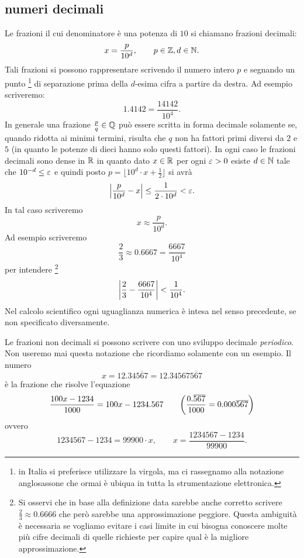 \subsection{numeri decimali}
%
Le frazioni il cui denominatore è una potenza
di $10$ si chiamano frazioni decimali:
\[
  x = \frac{p}{10^d}, \qquad p\in {\mathbb Z}, d\in {\mathbb N}.
\]
Tali frazioni si possono rappresentare
scrivendo il numero
intero $p$ e segnando un punto
\footnote{%
in Italia si preferisce utilizzare la virgola, ma
ci rassegnamo alla notazione anglosassone che ormai è
ubiqua in tutta la strumentazione elettronica.
}%
di separazione
prima della $d$-esima cifra a partire da destra.
Ad esempio scriveremo:
\[
  1.4142 = \frac{14142}{10^4}.
\]
In generale una frazione $\frac{p}{q}\in {\mathbb Q}$
può essere scritta in forma decimale solamente
se, quando ridotta ai minimi termini,
risulta che $q$ non ha fattori primi diversi
da $2$ e $5$ (in quanto le potenze di dieci
hanno solo questi fattori).
In ogni caso le frazioni decimali sono dense in ${\mathbb R}$
in quanto dato $x\in {\mathbb R}$ per ogni $\varepsilon>0$ esiste
$d\in {\mathbb N}$ tale che $10^{-d}\le\varepsilon$ e quindi
posto $p=\lfloor 10^d\cdot x + \frac 1 2\rfloor$
si avrà
\[
    {\left|\frac{p}{10^d} - x\right|} \le \frac{1}{2\cdot 10^d} < \varepsilon.
\]
In tal caso scriveremo
\mymargin{$\approx$}%
\index{$\approx$}
\[
  x \approx \frac{p}{10^d}.
\]
Ad esempio scriveremo
\[
  \frac 2 3 \approx 0.6667 = \frac{6667}{10^4}
\]
per intendere%
\footnote{%
Si osservi che in base alla definizione data sarebbe anche corretto 
scrivere $\frac 2 3 \approx 0.6666$ che però sarebbe una approssimazione 
peggiore. 
Questa ambiguità è necessaria se vogliamo evitare i casi 
limite in cui bisogna conoscere molte più cifre decimali di quelle richieste 
per capire qual è la migliore approssimazione.
}%
\begin{equation}\label{eq:approx_23}
{\left|\frac 2 3 - \frac{6667}{10^4}\right|}<\frac{1}{10^4}.
\end{equation}
Nel calcolo scientifico ogni uguaglianza numerica è intesa nel 
senso precedente, se non specificato diversamente. 

Le frazioni non decimali si possono scrivere con uno sviluppo
decimale \emph{periodico}. 
Non useremo mai questa notazione
che ricordiamo solamente con un esempio.
Il numero
\[
  x = 12.34\overline{567}
    = 12.34567\overline{567}
\]
è la frazione che risolve l'equazione
\[
  \frac{100x - 1234}{1000}
  = 100x-1234.567
  \qquad
{\left( \frac{0.\overline{567}}{1000}
= 0.000\overline{567}  \right)}
\]
ovvero
\[
  1234567 - 1234 = 99900 \cdot x,
  \qquad x = \frac{1234567-1234}{99900}.
\]

